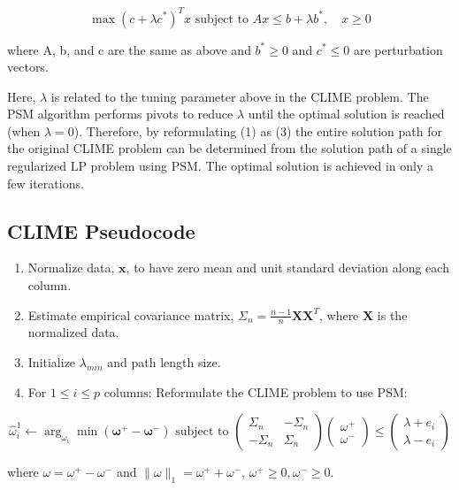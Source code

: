 \documentclass{article}
\begin{document}
\begin{equation}
\max (c+\lambda c^{*})^T x \text{ subject to } Ax\le b + \lambda b^{*}, \quad x\ge 0 
\end{equation}

where A, b, and c are the same as above and $b^{*}\ge 0$ and
$c^{*}\le 0$ are perturbation vectors.

Here, $\lambda$ is related to the tuning parameter above in the CLIME
problem. The PSM algorithm performs pivots to reduce $\lambda$ until the
optimal solution is reached (when $\lambda = 0$). Therefore, by
reformulating (1) as (3) the entire solution path for the original CLIME
problem can be determined from the solution path of a single regularized
LP problem using PSM. The optimal solution is achieved in only a few
iterations.

    \subsection{CLIME Pseudocode}\label{clime-pseudocode}

    \begin{enumerate}
\def\labelenumi{\arabic{enumi}.}
\item
  Normalize data, $\textbf{x}$, to have zero mean and unit standard
  deviation along each column.
\item
  Estimate empirical covariance matrix,
  $\Sigma_n=\frac{n-1}{n}\textbf{X}\textbf{X}^T$, where $\textbf{X}$ is
  the normalized data.
\item
  Initialize $\lambda_{min}$ and path length size.
\item
  For $1\le i\le p\text{ columns}$: Reformulate the CLIME problem to use
  PSM:
\end{enumerate}

\[\hat{\omega}_i^1\leftarrow\arg_{{\omega}_i}\min (\mathbf{\omega^{+}-\omega^{-}}) \text{ subject to  } \left( \begin{array}{cc}
\Sigma_n & -\Sigma_n \\
-\Sigma_n & \Sigma_n \end{array} \right) 
\left( \begin{array}{c}
\omega^+\\
\omega^-\end{array} \right)\le\left( \begin{array}{c}
\lambda+e_i\\
\lambda-e_i\end{array} \right)\]

where $\omega=\omega^{+}-\omega^-$ and
$\|\omega\|_1=\omega^{+}+\omega^-$, $\omega^{+}\ge 0, \omega^{-}\ge 0$.
\end{document}
